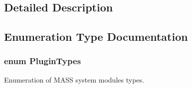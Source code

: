 \subsection{Detailed Description}


\subsection{Enumeration Type Documentation}
\subsubsection[{\texorpdfstring{Plugin\+Types}{PluginTypes}}]{\setlength{\rightskip}{0pt plus 5cm}enum Plugin\+Types}\hypertarget{group___main_menu_module_ga9b3bee49ce70df90694056c2f48c2e77}{}\label{group___main_menu_module_ga9b3bee49ce70df90694056c2f48c2e77}


Enumeration of M\+A\+SS system modules types. 

